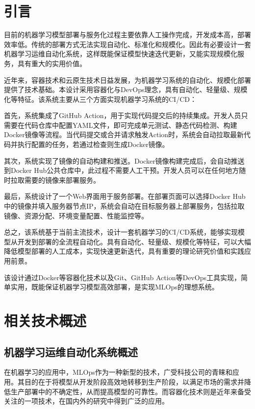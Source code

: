 \documentclass{HDU-Bachelor-Thesis}
\begin{document}
\section{引言}

目前的机器学习模型部署与服务化过程主要依靠人工操作完成，开发成本高，部署效率低。传统的部署方式无法实现自动化、标准化和规模化。因此有必要设计一套机器学习运维自动化系统，这样既能保证模型快速迭代更新，又能实现规模化服务，具有重大的实用价值。

近年来，容器技术和云原生技术日益发展，为机器学习系统的自动化、规模化部署提供了技术基础。本设计采用容器化与DevOps理念，具有自动化、轻量级、规模化等特征。该系统主要从三个方面实现机器学习系统的CI/CD：

首先，系统集成了GitHub Action，用于实现代码提交后的持续集成。开发人员只需要在代码仓库中配置YAML文件，即可完成单元测试、静态代码检测、构建Docker镜像等流程。当代码提交或合并请求触发Action时，系统会自动拉取最新代码并执行配置的任务，若通过检查则生成Docker镜像。

其次，系统实现了镜像的自动构建和推送。Docker镜像构建完成后，会自动推送到Docker Hub公共仓库中，此过程不需要人工干预。开发人员可以在任何地方随时拉取需要的镜像来部署服务。

最后，系统设计了一个Web界面用于服务部署。在部署页面可以选择Docker Hub中的镜像并填入服务器节点IP，系统会自动在目标服务器上部署服务，包括拉取镜像、资源分配、环境变量配置、性能监控等。

总之，该系统基于当前主流技术，设计一套机器学习的CI/CD系统，能够实现模型从开发到部署的全流程自动化。具有自动化、轻量级、规模化等特征，可以大幅降低模型部署的人工成本，实现快速更新迭代，具有重要的理论研究价值和实践应用前景。

该设计通过Docker等容器化技术以及Git、GitHub Action等DevOps工具实现，简单实用，既能保证机器学习模型高效部署，是实现MLOps的理想系统。

\setcounter{table}{0}
\setcounter{figure}{0}
\clearpage
\section{相关技术概述}
\subsection{机器学习运维自动化系统概述}

在机器学习的应用中，MLOps作为一种新型的技术，广受科技公司的青睐和应用。其目的在于将模型从开发阶段高效地转移到生产阶段，以满足市场的需求并降低生产部署中的不确定性，从而提高模型的可靠性。而容器化技术则是近年来备受关注的一项技术，在国内外的研究中得到广泛的应用。
\end{document}
